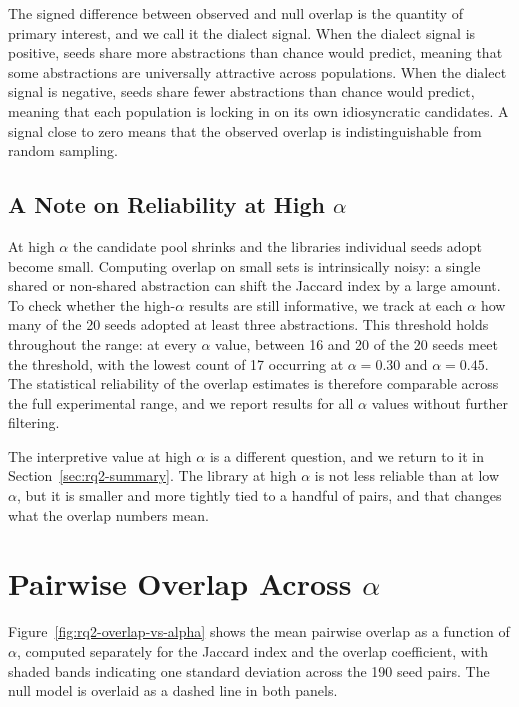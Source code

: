 The signed difference between observed and null overlap is the quantity of primary interest, and we call it the dialect signal. When the dialect signal is positive, seeds share more abstractions than chance would predict, meaning that some abstractions are universally attractive across populations. When the dialect signal is negative, seeds share fewer abstractions than chance would predict, meaning that each population is locking in on its own idiosyncratic candidates. A signal close to zero means that the observed overlap is indistinguishable from random sampling.

\subsection{A Note on Reliability at High $\alpha$}
\label{sec:rq2-reliability}

At high $\alpha$ the candidate pool shrinks and the libraries individual seeds adopt become small. Computing overlap on small sets is intrinsically noisy: a single shared or non-shared abstraction can shift the Jaccard index by a large amount. To check whether the high-$\alpha$ results are still informative, we track at each $\alpha$ how many of the 20 seeds adopted at least three abstractions. This threshold holds throughout the range: at every $\alpha$ value, between 16 and 20 of the 20 seeds meet the threshold, with the lowest count of 17 occurring at $\alpha = 0.30$ and $\alpha = 0.45$. The statistical reliability of the overlap estimates is therefore comparable across the full experimental range, and we report results for all $\alpha$ values without further filtering.

The interpretive value at high $\alpha$ is a different question, and we return to it in Section~\ref{sec:rq2-summary}. The library at high $\alpha$ is not less reliable than at low $\alpha$, but it is smaller and more tightly tied to a handful of pairs, and that changes what the overlap numbers mean.

\section{Pairwise Overlap Across $\alpha$}
\label{sec:rq2-results}

Figure~\ref{fig:rq2-overlap-vs-alpha} shows the mean pairwise overlap as a function of $\alpha$, computed separately for the Jaccard index and the overlap coefficient, with shaded bands indicating one standard deviation across the 190 seed pairs. The null model is overlaid as a dashed line in both panels.


